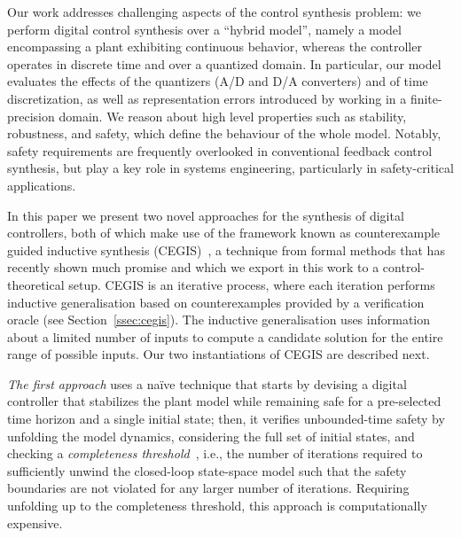 \documentclass[twocolumn]{autart}    %
\begin{document}
Our work addresses challenging aspects of the control synthesis problem:  
we perform digital control synthesis over a ``hybrid model'',
namely a model encompassing a plant exhibiting continuous behavior, 
whereas the controller operates in discrete time and over a quantized domain.  
In particular, our model evaluates the effects of the quantizers (A/D and D/A
converters) and of time discretization, as well as representation
errors introduced by working  %
in a finite-precision domain. 
We reason about high level properties such as stability, robustness, and safety, which define the
behaviour of the whole model.  
Notably, safety requirements are frequently overlooked in conventional feedback control synthesis, but
play a key role in systems engineering, particularly in safety-critical applications.  

In this paper we present two novel approaches for the synthesis of
digital controllers, both of which make use of the framework known as counterexample guided
inductive synthesis (CEGIS)~\cite{jha-icse10,
  DBLP:conf/asplos/Solar-LezamaTBSS06}, 
  a technique from formal methods that has recently shown much promise and which we export in this work to a control-theoretical setup.  
CEGIS is an iterative process, where each iteration performs inductive
generalisation based on counterexamples provided by a verification
oracle (see Section~\ref{ssec:cegis}). The inductive generalisation uses information 
about a limited number of inputs to compute a candidate solution
for the entire range of possible inputs. Our two instantiations of CEGIS are described next.


\emph{The first approach} uses a na\"ive technique that starts by devising a
digital controller that stabilizes the plant model while remaining safe for a
pre-selected time horizon and a single initial state; then, it verifies
unbounded-time safety by unfolding the model dynamics, considering the 
full set of initial states, and checking a \emph{completeness
threshold}~\cite{DBLP:conf/vmcai/KroeningS03}, i.e., the number of
iterations required to sufficiently unwind the closed-loop state-space
model such that the safety boundaries are not violated for any larger number of
iterations.  Requiring unfolding up to the completeness threshold, this
approach is computationally expensive.
\end{document}
